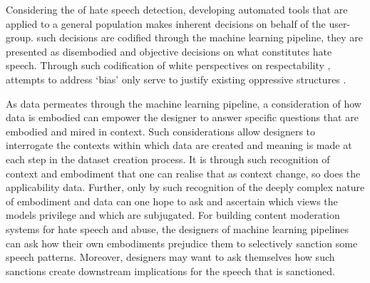 Considering the  of hate speech detection, developing automated tools that are applied to a general population makes inherent decisions on behalf of the user-group.
 such decisions are codified through the machine learning pipeline, they are presented as disembodied and objective decisions on what constitutes hate speech.
Through such codification of white perspectives on respectability , attempts to address `bias'  only serve to justify existing oppressive structures .

As data permeates through the machine learning pipeline, a consideration of how data is embodied can empower the designer to answer specific questions that are embodied and mired in context.
Such considerations allow designers to interrogate the contexts within which data are created and meaning is made at each step in the dataset creation process.
It is through such recognition of context and embodiment that one can realise that as context change, so does the applicability data.
Further, only by such recognition of the deeply complex nature of embodiment and data can one hope to ask and ascertain which views the models privilege and which are subjugated.
For building content moderation systems for hate speech and abuse, the designers of machine learning pipelines can ask how their own embodiments prejudice them to selectively sanction some speech patterns.
Moreover, designers may want to ask themselves how such sanctions create downstream implications for the speech that is sanctioned.

